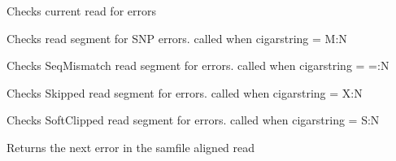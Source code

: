 \documentclass[letterpaper,10pt,english]{sphinxmanual}
\begin{document}
\begin{fulllineitems}
\begin{fulllineitems}
\label{index:proto_err.errorCount.errorReader.checkRead}
Checks current read for errors

\end{fulllineitems}


\begin{fulllineitems}
\label{index:proto_err.errorCount.errorReader.checkSNPs}
Checks read segment for SNP errors. called when cigarstring = M:N

\end{fulllineitems}


\begin{fulllineitems}
\label{index:proto_err.errorCount.errorReader.checkSeqMismatch}
Checks SeqMismatch read segment for errors. called when cigarstring = =:N

\end{fulllineitems}


\begin{fulllineitems}
\label{index:proto_err.errorCount.errorReader.checkSkipped}
Checks Skipped read segment for errors. called when cigarstring = X:N

\end{fulllineitems}


\begin{fulllineitems}
\label{index:proto_err.errorCount.errorReader.checkSoftClipped}
Checks SoftClipped read segment for errors. called when cigarstring = S:N

\end{fulllineitems}


\begin{fulllineitems}
\label{index:proto_err.errorCount.errorReader.next}
Returns the next error in the samfile aligned read


\end{fulllineitems}
\end{fulllineitems}
\end{document}
